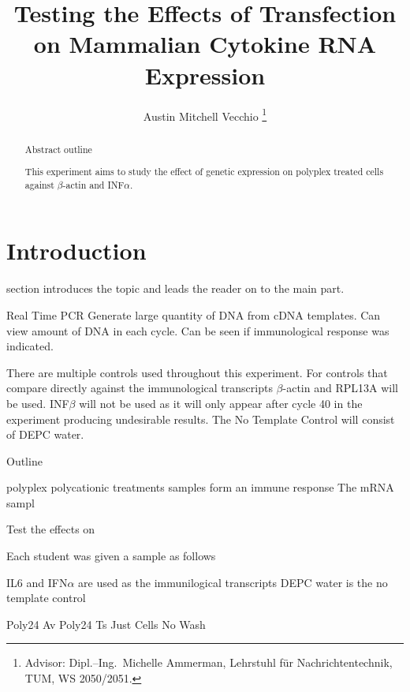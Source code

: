 \documentclass[journal, a4paper]{IEEEtran}
\begin{document}
    \title{Testing the Effects of Transfection on Mammalian Cytokine RNA Expression}
    \author{Austin Mitchell Vecchio
    \thanks{Advisor: Dipl.--Ing.~Michelle Ammerman, Lehrstuhl f\"ur Nachrichtentechnik, TUM, WS 2050/2051.}}
    \maketitle

\begin{abstract}
  Abstract outline


  This experiment aims to study the effect of genetic expression on polyplex treated cells against $\beta$-actin and INF$\alpha$.

\end{abstract}

\section{Introduction}
     section introduces the topic and leads the reader on to the main part.

    Real Time PCR
      Generate large quantity of DNA from cDNA templates. Can view amount of DNA in each cycle.
      Can be seen if immunological response was indicated.

      There are multiple controls used throughout this experiment. For controls that compare directly against the immunological
      transcripts $\beta$-actin and RPL13A will be used. INF$\beta$ will not be used as it will only appear after cycle 40 in the experiment producing undesirable results.
      The No Template Control will consist of DEPC water.

    Outline

      polyplex polycationic
      treatments
      samples
      form an immune response
    The mRNA sampl

Test the effects on

Each student was given a sample as follows

 IL6 and IFN$\alpha$ are used as the immunilogical transcripts
DEPC water is the no template control

Poly24 Av
Poly24 Ts
Just Cells
No Wash
\end{document}
